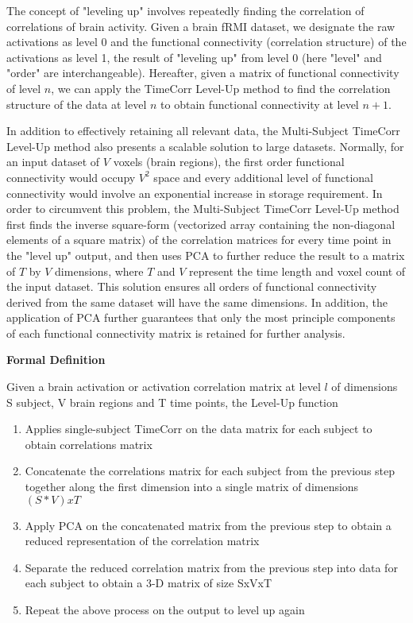\documentclass[12pt]{article}
\begin{document}
The concept of "leveling up" involves repeatedly finding the correlation of correlations of brain activity. Given a brain fRMI dataset, we designate the raw activations as level 0 and the functional connectivity (correlation structure) of the activations as level 1, the result of "leveling up" from level 0 (here "level" and "order" are interchangeable). Hereafter, given a matrix of functional connectivity of level $n$, we can apply the TimeCorr Level-Up method to find the correlation structure of the data at level $n$ to obtain functional connectivity at level $n+1$.

In addition to effectively retaining all relevant data, the Multi-Subject TimeCorr Level-Up method also presents a scalable solution to large datasets. Normally, for an input dataset of $V$ voxels (brain regions), the first order functional connectivity would occupy $V^2$ space and every additional level of functional connectivity would involve an exponential increase in storage requirement. In order to circumvent this problem, the Multi-Subject TimeCorr Level-Up method first finds the inverse square-form (vectorized array containing the non-diagonal elements of a square matrix) of the correlation matrices for every time point in the "level up" output, and then uses PCA to further reduce the result to a matrix of $T$ by $V$ dimensions, where $T$ and $V$ represent the time length and voxel count of the input dataset. This solution ensures all orders of functional connectivity derived from the same dataset will have the same dimensions. In addition, the application of PCA further guarantees that only the most principle components of each functional connectivity matrix is retained for further analysis.

\large{\textbf{Formal Definition}}

\normalsize
Given a brain activation or activation correlation matrix at level $l$ of dimensions S subject, V brain regions and T time points, the Level-Up function

\begin{enumerate}
\item Applies single-subject TimeCorr on the data matrix for each subject to obtain correlations matrix

\item Concatenate the correlations matrix for each subject from the previous step together along the first dimension into a single matrix of dimensions $(S*V)xT$

\item Apply PCA on the concatenated matrix from the previous step to obtain a reduced representation of the correlation matrix

\item Separate the reduced correlation matrix from the previous step into data for each subject to obtain a 3-D matrix of size SxVxT

\item Repeat the above process on the output to level up again

\end{enumerate}
\end{document}
